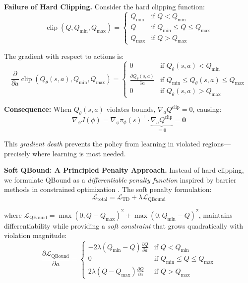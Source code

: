 \documentclass[11pt]{article}
\theoremstyle{definition}
\theoremstyle{remark}
\DeclareMathOperator{\clip}{clip}
\begin{document}
\textbf{Failure of Hard Clipping.}
Consider the hard clipping function:
\begin{equation}
\clip(Q, Q_{\min}, Q_{\max}) = \begin{cases}
Q_{\min} & \text{if } Q < Q_{\min} \\
Q & \text{if } Q_{\min} \leq Q \leq Q_{\max} \\
Q_{\max} & \text{if } Q > Q_{\max}
\end{cases}
\end{equation}

The gradient with respect to actions is:
\begin{equation}
\frac{\partial}{\partial a} \clip(Q_\theta(s,a), Q_{\min}, Q_{\max}) = \begin{cases}
0 & \text{if } Q_\theta(s,a) < Q_{\min} \\
\frac{\partial Q_\theta(s,a)}{\partial a} & \text{if } Q_{\min} \leq Q_\theta(s,a) \leq Q_{\max} \\
0 & \text{if } Q_\theta(s,a) > Q_{\max}
\end{cases}
\end{equation}

\textbf{Consequence:} When $Q_\theta(s,a)$ violates bounds, $\nabla_a Q^{\text{clip}} = 0$, causing:
\begin{equation}
\nabla_\phi J(\phi) = \nabla_\phi \pi_\phi(s)^\top \cdot \underbrace{\nabla_a Q^{\text{clip}}}_{\mathbf{=0}} = \mathbf{0}
\end{equation}

This \textit{gradient death} prevents the policy from learning in violated regions—precisely where learning is most needed.

\textbf{Soft QBound: A Principled Penalty Approach.}
Instead of hard clipping, we formulate QBound as a \textit{differentiable penalty function} inspired by barrier methods in constrained optimization \citep{boyd2004convex}. The soft penalty formulation:
\begin{equation}
\mathcal{L}_{\text{total}} = \mathcal{L}_{\text{TD}} + \lambda \mathcal{L}_{\text{QBound}}
\end{equation}

where $\mathcal{L}_{\text{QBound}} = \max(0, Q - Q_{\max})^2 + \max(0, Q_{\min} - Q)^2$, maintains differentiability while providing a \textit{soft constraint} that grows quadratically with violation magnitude:
\begin{equation}
\frac{\partial \mathcal{L}_{\text{QBound}}}{\partial a} = \begin{cases}
-2\lambda(Q_{\min} - Q) \frac{\partial Q}{\partial a} & \text{if } Q < Q_{\min} \\
0 & \text{if } Q_{\min} \leq Q \leq Q_{\max} \\
2\lambda(Q - Q_{\max}) \frac{\partial Q}{\partial a} & \text{if } Q > Q_{\max}
\end{cases}
\end{equation}
\end{document}
